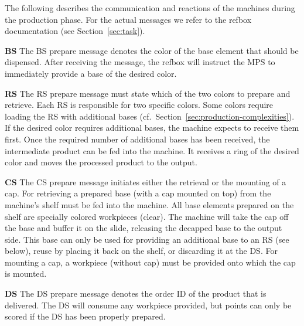 \documentclass[12pt,twoside]{article}
\newcommand{\refsec}[1]{Section~\ref{#1}}
\begin{document}
The following describes the communication and reactions of the
machines during the production phase. For the actual messages we refer
to the \ac{refbox} documentation (see \refsec{sec:task}).

\smallskip

\noindent\textbf{\acl{BS}}
The \ac{BS} prepare message denotes the color of the base element that should
be dispensed. After receiving the message, the \ac{refbox} will instruct
the \ac{MPS} to immediately provide a base of the desired color.

\noindent\textbf{\acl{RS}}
The \ac{RS} prepare message must state which of the two colors to prepare and
retrieve. Each \ac{RS} is responsible for two specific colors. Some colors
require loading the \ac{RS} with additional bases
(cf.~\refsec{sec:production-complexities}). If the desired color requires
additional bases, the machine expects to receive them first.
Once the required number of
additional bases has been received, the intermediate product can be
fed into the machine. It receives a ring of the desired color and
moves the processed product to the output.

\noindent\textbf{\acl{CS}}
The \ac{CS} prepare message initiates either the retrieval or the mounting of
a cap. For retrieving a prepared base (with a cap mounted on top) from
the machine's shelf must be fed into the machine. All base elements
prepared on the shelf are specially colored workpieces (clear). The
machine will take the cap off the base and buffer it on the slide,
releasing the decapped base to the output side. This base can only be
used for providing an additional base to an \ac{RS} (see below), reuse by
placing it back on the shelf, or discarding it at the \ac{DS}.  For
mounting a cap, a workpiece (without cap) must be provided onto which
the cap is mounted.

\noindent\textbf{\acl{DS}}
The \ac{DS} prepare message denotes the order ID of the product
that is delivered.
The \ac{DS} will consume any workpiece provided,
but points can only be scored if the \ac{DS} has been properly prepared.
\end{document}
